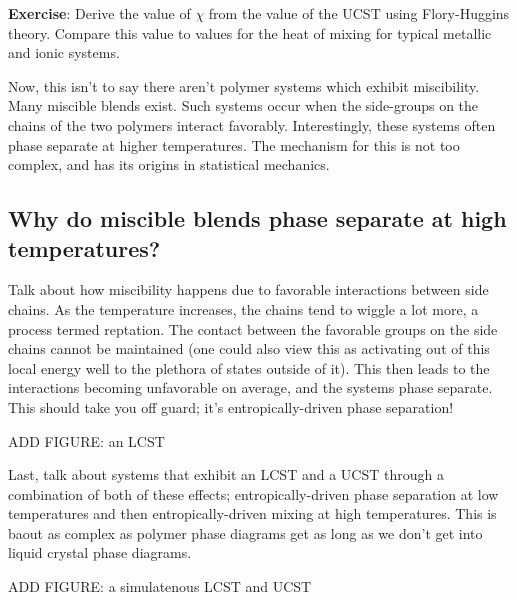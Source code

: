 \documentclass[12pt]{article}
\begin{document}
\textbf{Exercise}: Derive the value of $\chi$ from the value of the UCST using Flory-Huggins theory. Compare this value to values for the heat of mixing for typical metallic and ionic systems. 

Now, this isn't to say there aren't polymer systems which exhibit miscibility. Many miscible blends exist. Such systems occur when the side-groups on the chains of the two polymers interact favorably. Interestingly, these systems often phase separate at higher temperatures. The mechanism for this is not too complex, and has its origins in statistical mechanics.

\subsection{Why do miscible blends phase separate at high temperatures?}

Talk about how miscibility happens due to favorable interactions between side chains. As the temperature increases, the chains tend to wiggle a lot more, a process termed reptation. The contact between the favorable groups on the side chains cannot be maintained (one could also view this as activating out of this local energy well to the plethora of states outside of it). This then leads to the interactions becoming unfavorable on average, and the systems phase separate. This should take you off guard; it's entropically-driven phase separation! 

ADD FIGURE: an LCST

Last, talk about systems that exhibit an LCST and a UCST through a combination of both of these effects; entropically-driven phase separation at low temperatures and then entropically-driven mixing at high temperatures. This is baout as complex as polymer phase diagrams get as long as we don't get into liquid crystal phase diagrams.

ADD FIGURE: a simulatenous LCST and UCST
\end{document}
